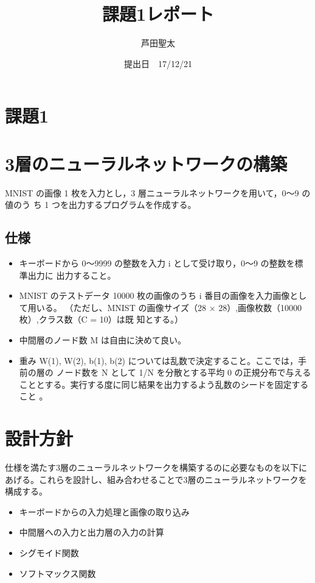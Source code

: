 \documentclass{ujarticle}
\title {課題1レポート}
\author{芦田聖太}
\date{提出日　17/12/21}
\begin{document}
\begin{titlepage}
\maketitle
\thispagestyle{empty}
\end{titlepage}


\section*{課題1}
\section{3層のニューラルネットワークの構築}
MNIST の画像 1 枚を入力とし，3 層ニューラルネットワークを用いて，0～9 の値のう
ち 1 つを出力するプログラムを作成する。

\subsection*{仕様}
\begin{itemize}
\item キーボードから 0～9999 の整数を入力 i として受け取り，0～9 の整数を標準出力に
出力すること。
\item MNIST のテストデータ 10000 枚の画像のうち i 番目の画像を入力画像として用いる。
（ただし、MNIST の画像サイズ（28 × 28）,画像枚数（10000 枚）,クラス数（C = 10）は既
知とする。）
\item 中間層のノード数 M は自由に決めて良い。
\item 重み W(1), W(2), b(1), b(2) については乱数で決定すること。ここでは，手前の層の
ノード数を N として 1/N を分散とする平均 0 の正規分布で与えることとする。実行する度に同じ結果を出力するよう乱数のシードを固定すること 。
\end{itemize}


\section{設計方針}
仕様を満たす3層のニューラルネットワークを構築するのに必要なものを以下にあげる。これらを設計し、組み合わせることで3層のニューラルネットワークを構成する。
\begin{itemize}
\item キーボードからの入力処理と画像の取り込み
\item 中間層への入力と出力層の入力の計算
\item シグモイド関数
\item ソフトマックス関数
\end{itemize}
\end{document}
